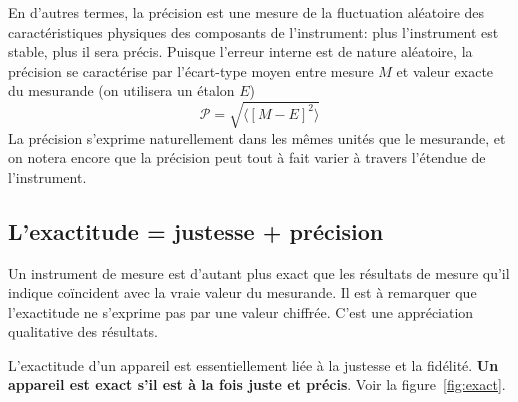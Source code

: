 En d'autres termes, la précision est une mesure de la fluctuation aléatoire des caractéristiques physiques des composants de l'instrument: plus l'instrument est stable, plus il sera précis. Puisque l'erreur interne est de nature aléatoire, la précision se caractérise par l'écart-type moyen entre mesure $M$ et valeur exacte du mesurande (on utilisera un étalon $E$)
$$
    \mathcal{P}=\sqrt{\langle[M-E]^2\rangle}
$$
La précision s'exprime naturellement dans les mêmes unités que le mesurande, et on notera encore que la précision peut tout à fait varier à travers l'étendue de l'instrument.

\subsection{L'exactitude = justesse + précision}

Un instrument de mesure est d'autant plus exact que les résultats de mesure qu'il indique coïncident avec la vraie valeur du mesurande. Il est à remarquer que l'exactitude ne s'exprime pas par une valeur chiffrée. C'est une appréciation qualitative des résultats.

L'exactitude d'un appareil est essentiellement liée à la justesse et la fidélité. \textbf{Un appareil est exact s'il est à la fois juste et précis}. Voir la figure~\ref{fig:exact}.

